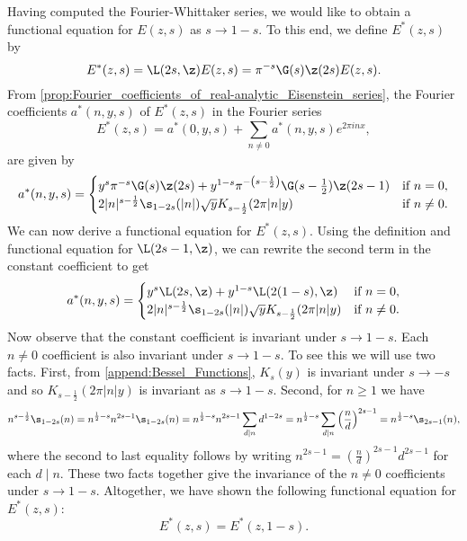       Having computed the Fourier-Whittaker series, we would like to obtain a functional equation for $E(z,s)$ as $s \to 1-s$. To this end, we define $E^{\ast}(z,s)$ by
      \[
        E^{\ast}(z,s) = \L(2s,\z)E(z,s) = \pi^{-s}\G(s)\z(2s)E(z,s).
      \]
      From \cref{prop:Fourier_coefficients_of_real-analytic_Eisenstein_series}, the Fourier coefficients $a^{\ast}(n,y,s)$ of $E^{\ast}(z,s)$ in the Fourier series
      \[
        E^{\ast}(z,s) = a^{\ast}(0,y,s)+\sum_{n \neq 0}a^{\ast}(n,y,s)e^{2\pi inx},
      \]
       are given by
      \[
        a^{\ast}(n,y,s) = \begin{cases} y^{s}\pi^{-s}\G(s)\z(2s)+y^{1-s}\pi^{-\left(s-\frac{1}{2}\right)}\G(s-\frac{1}{2})\z(2s-1) & \text{if $n = 0$}, \\ 2|n|^{s-\frac{1}{2}}\s_{1-2s}(|n|)\sqrt{y}K_{s-\frac{1}{2}}(2\pi|n|y) & \text{if $n \neq 0$}. \end{cases}
      \]
      We can now derive a functional equation for $E^{\ast}(z,s)$. Using the definition and functional equation for $\L(2s-1,\z)$, we can rewrite the second term in the constant coefficient to get
      \begin{equation}\label{equ:Fourier_coefficients_for_completed_real-analytic_Eisenstein_series}
        a^{\ast}(n,y,s) = \begin{cases} y^{s}\L(2s,\z)+y^{1-s}\L(2(1-s),\z) & \text{if $n = 0$}, \\ 2|n|^{s-\frac{1}{2}}\s_{1-2s}(|n|)\sqrt{y}K_{s-\frac{1}{2}}(2\pi|n|y) & \text{if $n \neq 0$}. \end{cases}
      \end{equation}
      Now observe that the constant coefficient is invariant under $s \to 1-s$. Each $n \neq 0$ coefficient is also invariant under $s \to 1-s$. To see this we will use two facts. First, from \cref{append:Bessel_Functions}, $K_{s}(y)$ is invariant under $s \to -s$ and so $K_{s-\frac{1}{2}}(2\pi|n|y)$ is invariant as $s \to 1-s$. Second, for $n \ge 1$ we have
      \[
        n^{s-\frac{1}{2}}\s_{1-2s}(n) = n^{\frac{1}{2}-s}n^{2s-1}\s_{1-2s}(n) = n^{\frac{1}{2}-s}n^{2s-1}\sum_{d \mid n}d^{1-2s} = n^{\frac{1}{2}-s}\sum_{d \mid n}\left(\frac{n}{d}\right)^{2s-1} = n^{\frac{1}{2}-s}\s_{2s-1}(n),
      \]
      where the second to last equality follows by writing $n^{2s-1} = \left(\frac{n}{d}\right)^{2s-1}d^{2s-1}$ for each $d \mid n$. These two facts together give the invariance of the $n \neq 0$ coefficients under $s \to 1-s$. Altogether, we have shown the following functional equation for $E^{\ast}(z,s)$:
      \[
        E^{\ast}(z,s) = E^{\ast}(z,1-s).
      \]
